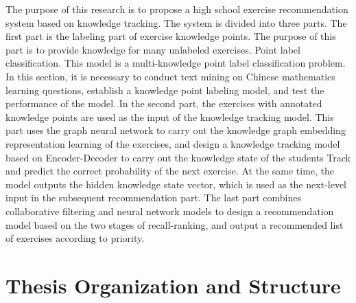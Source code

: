 The purpose of this research is to propose a high school exercise recommendation system based on knowledge tracking. The system is divided into three parts. The first part is the labeling part of exercise knowledge points. The purpose of this part is to provide knowledge for many unlabeled exercises. Point label classification. This model is a multi-knowledge point label classification problem. In this section, it is necessary to conduct text mining on Chinese mathematics learning questions, establish a knowledge point labeling model, and test the performance of the model. In the second part, the exercises with annotated knowledge points are used as the input of the knowledge tracking model. This part uses the graph neural network to carry out the knowledge graph embedding representation learning of the exercises, and design a knowledge tracking model based on Encoder-Decoder to carry out the knowledge state of the students Track and predict the correct probability of the next exercise. At the same time, the model outputs the hidden knowledge state vector, which is used as the next-level input in the subsequent recommendation part. The last part combines collaborative filtering and neural network models to design a recommendation model based on the two stages of recall-ranking, and output a recommended list of exercises according to priority.

\section{Thesis Organization and Structure}


